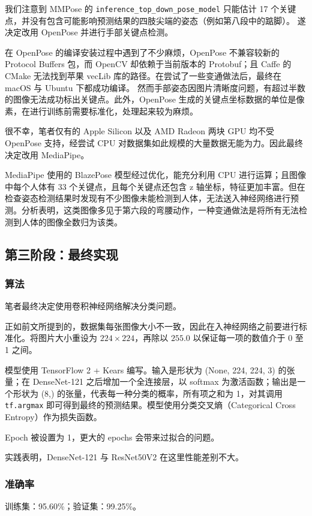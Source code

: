 \documentclass[12pt,titlepage]{article}
\begin{document}
我们注意到 MMPose 的 \verb|inference_top_down_pose_model| 只能估计 17 个关键点，并没有包含可能影响预测结果的四肢尖端的姿态（例如第八段中的踮脚）。
遂决定改用 OpenPose 并进行手部关键点检测。

在 OpenPose 的编译安装过程中遇到了不少麻烦，OpenPose 不兼容较新的 Protocol Buffers 包，而 OpenCV 却依赖于当前版本的 Protobuf；且 Caffe 的 CMake 无法找到苹果 vecLib 库的路径。在尝试了一些变通做法后，最终在 macOS 与 Ubuntu 下都成功编译。
然而手部姿态因图片清晰度问题，有超过半数的图像无法成功标出关键点。此外，OpenPose 生成的关键点坐标数据的单位是像素，在进行训练前需要标准化，处理起来较为麻烦。

很不幸，笔者仅有的 Apple Silicon 以及 AMD Radeon 两块 GPU 均不受 OpenPose 支持，经尝试 CPU 对数据集如此规模的大量数据无能为力。因此最终决定改用 MediaPipe。

MediaPipe 使用的 BlazePose 模型经过优化，能充分利用 CPU 进行运算；且图像中每个人体有 33 个关键点，且每个关键点还包含 z 轴坐标，特征更加丰富。但在检查姿态检测结果时发现有不少图像未能检测到人体，无法送入神经网络进行预测。分析表明，这类图像多见于第六段的弯腰动作，一种变通做法是将所有无法检测到人体的图像全数归为该类。

\subsection{第三阶段：最终实现}

\subsubsection{算法}

笔者最终决定使用卷积神经网络解决分类问题。

正如前文所提到的，数据集每张图像大小不一致，因此在入神经网络之前要进行标准化。将图片大小重设为 $224 \times 224$，再除以 $255.0$ 以保证每一项的数值介于 0 至 1 之间。

模型使用 TensorFlow 2 + Kears 编写。输入是形状为 (None, 224, 224, 3) 的张量；在 DenseNet-121 之后增加一个全连接层，以 softmax 为激活函数；输出是一个形状为 (8,) 的张量，代表每一种分类的概率，所有项之和为 1，对其调用 \verb|tf.argmax| 即可得到最终的预测结果。模型使用分类交叉熵（Categorical Cross Entropy）作为损失函数。

Epoch 被设置为 1，更大的 epochs 会带来过拟合的问题。

实践表明，DenseNet-121 与 ResNet50V2 在这里性能差别不大。

\subsubsection{准确率}

训练集：95.60\%；验证集：99.25\%。



\end{document}
